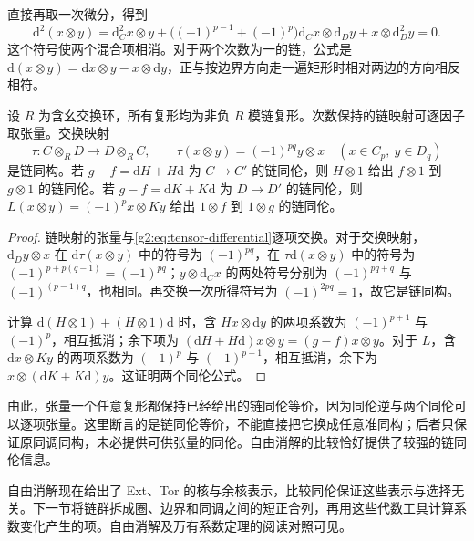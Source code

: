 直接再取一次微分，得到
\[
	\mathrm{d}^2(x\otimes y)=\mathrm{d}_C^2x\otimes y+
	\bigl((-1)^{p-1}+(-1)^p\bigr)\mathrm{d}_Cx\otimes\mathrm{d}_Dy+
	x\otimes\mathrm{d}_D^2y=0.
\]
这个符号使两个混合项相消。对于两个次数为一的链，公式是 \(\mathrm{d}(x\otimes y)=\mathrm{d}x\otimes y-x\otimes\mathrm{d}y\)，正与按边界方向走一遍矩形时相对两边的方向相反相符。

\begin{proposition}\label{g2:prop:tensor-sign-homotopy}
	设 \(R\) 为含幺交换环，所有复形均为非负 \(R\) 模链复形。次数保持的链映射可逐因子取张量。交换映射
	\[
		\tau:C\otimes_R D\longrightarrow D\otimes_R C,
		\qquad \tau(x\otimes y)=(-1)^{pq}y\otimes x\quad(x\in C_p,\ y\in D_q)
	\]
	是链同构。若 \(g-f=\mathrm{d}H+H\mathrm{d}\) 为 \(C\to C'\) 的链同伦，则 \(H\otimes1\) 给出 \(f\otimes1\) 到 \(g\otimes1\) 的链同伦。若 \(g-f=\mathrm{d}K+K\mathrm{d}\) 为 \(D\to D'\) 的链同伦，则 \(L(x\otimes y)=(-1)^p x\otimes Ky\) 给出 \(1\otimes f\) 到 \(1\otimes g\) 的链同伦。
\end{proposition}
\begin{proof}
	链映射的张量与\eqref{g2:eq:tensor-differential}逐项交换。对于交换映射，\(\mathrm{d}_Dy\otimes x\) 在 \(\mathrm{d}\tau(x\otimes y)\) 中的符号为 \( (-1)^{pq}\)，在 \(\tau\mathrm{d}(x\otimes y)\) 中的符号为 \( (-1)^{p+p(q-1)}=(-1)^{pq}\)；\(y\otimes\mathrm{d}_Cx\) 的两处符号分别为 \( (-1)^{pq+q}\) 与 \( (-1)^{(p-1)q}\)，也相同。再交换一次所得符号为 \( (-1)^{2pq}=1\)，故它是链同构。

	计算 \(\mathrm{d}(H\otimes1)+(H\otimes1)\mathrm{d}\) 时，含 \(Hx\otimes\mathrm{d}y\) 的两项系数为 \( (-1)^{p+1}\) 与 \( (-1)^p\)，相互抵消；余下项为 \( (\mathrm{d}H+H\mathrm{d})x\otimes y=(g-f)x\otimes y\)。对于 \(L\)，含 \(\mathrm{d}x\otimes Ky\) 的两项系数为 \( (-1)^p\) 与 \( (-1)^{p-1}\)，相互抵消，余下为 \(x\otimes(\mathrm{d}K+K\mathrm{d})y\)。这证明两个同伦公式。
\end{proof}

由此，张量一个任意复形都保持已经给出的链同伦等价，因为同伦逆与两个同伦可以逐项张量。这里断言的是链同伦等价，不能直接把它换成任意准同构；后者只保证原同调同构，未必提供可供张量的同伦。自由消解的比较恰好提供了较强的链同伦信息。

\ProseParagraphBreak

自由消解现在给出了 Ext、Tor 的核与余核表示，比较同伦保证这些表示与选择无关。下一节将链群拆成圈、边界和同调之间的短正合列，再用这些代数工具计算系数变化产生的项。自由消解及万有系数定理的阅读对照可见\cite[第3.1节与第3.A节]{Hatcher2002}。
